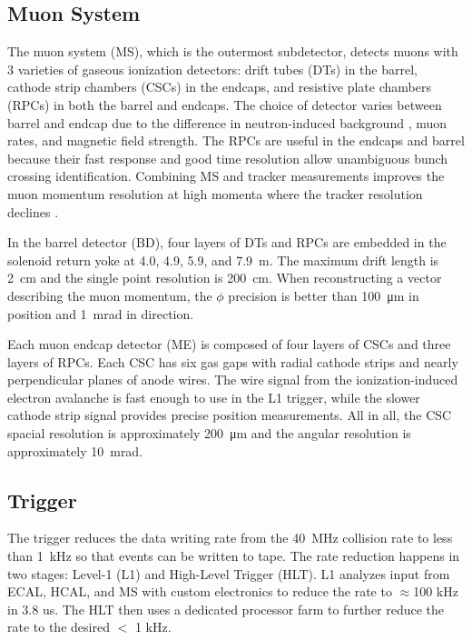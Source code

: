 \documentclass[12pt]{article}
\begin{document}
    \subsection{Muon System}
        The muon system (MS), which is the outermost subdetector, detects muons with \num{3} varieties of gaseous ionization detectors: drift tubes (DTs) in the barrel, cathode strip chambers (CSCs) in the endcaps, and resistive plate chambers (RPCs) in both the barrel and endcaps. The choice of detector varies between barrel and endcap due to the difference in neutron-induced background , muon rates, and magnetic field strength. The RPCs are useful in the endcaps and barrel because their fast response and good time resolution allow unambiguous bunch crossing identification. Combining MS and tracker measurements improves the muon momentum resolution at high momenta where the tracker resolution declines \cite{cms_experiment, cms_tdr}.

        In the barrel detector (BD), four layers of DTs and RPCs are embedded in the solenoid return yoke at \num{4.0}, \num{4.9}, \num{5.9}, and \SI{7.9}{m}. The maximum drift length is \SI{2}{\cm} and the single point resolution is \SI{200}{\cm}. When reconstructing a vector describing the muon momentum, the $\phi$ precision is better than \SI{100}{\micro\m} in position and \SI{1}{\milli\radian} in direction. 

        Each muon endcap detector (ME) is composed of four layers of CSCs and three layers of RPCs. Each CSC has six gas gaps with radial cathode strips and nearly perpendicular planes of anode wires. The wire signal from the ionization-induced electron avalanche is fast enough to use in the L1 trigger, while the slower  cathode strip signal provides precise  position measurements. All in all, the CSC spacial resolution is approximately \SI{200}{\micro\m} and the angular resolution is approximately \SI{10}{\milli\radian}.

    \subsection{Trigger}
        The trigger reduces the data writing rate from the \SI{40}{\mega\hertz} collision rate to less than \SI{1}{\kilo\hertz} so that events can be written to tape. The rate reduction happens in two stages: Level-1 (L1) and High-Level Trigger (HLT). L1 analyzes input from ECAL, HCAL, and MS with custom electronics to reduce the rate to $\approx$100 kHz in 3.8 us. The HLT then uses a dedicated processor farm to further reduce the rate to the desired $<$ 1 kHz\cite{cms_experiment, cms_trigger_upgrade}.
\end{document}
